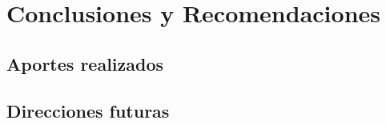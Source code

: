 
\chapter{Conclusiones y Recomendaciones}
\label{Capitulo5}
\section{Aportes realizados}
\section{Direcciones futuras}
